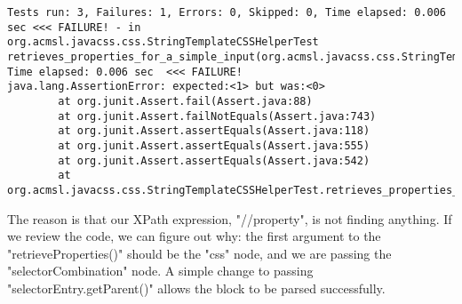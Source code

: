\documentclass[11pt]{article}
\begin{document}
\begin{verbatim}
Tests run: 3, Failures: 1, Errors: 0, Skipped: 0, Time elapsed: 0.006 sec <<< FAILURE! - in org.acmsl.javacss.css.StringTemplateCSSHelperTest
retrieves_properties_for_a_simple_input(org.acmsl.javacss.css.StringTemplateCSSHelperTest)  Time elapsed: 0.006 sec  <<< FAILURE!
java.lang.AssertionError: expected:<1> but was:<0>
        at org.junit.Assert.fail(Assert.java:88)
        at org.junit.Assert.failNotEquals(Assert.java:743)
        at org.junit.Assert.assertEquals(Assert.java:118)
        at org.junit.Assert.assertEquals(Assert.java:555)
        at org.junit.Assert.assertEquals(Assert.java:542)
        at org.acmsl.javacss.css.StringTemplateCSSHelperTest.retrieves_properties_for_a_simple_input(StringTemplateCSSHelperTest.java:125)
\end{verbatim}

The reason is that our XPath expression, "//property", is not finding anything. If we review the code, we can figure out why: the first argument to the "retrieveProperties()" should be the "css" node, and we are passing the "selectorCombination" node.
A simple change to passing "selectorEntry.getParent()" allows the block to be parsed successfully.
\end{document}
